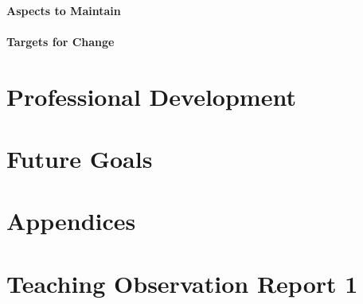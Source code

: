 \documentclass{article}
\begin{document}
\paragraph{Aspects to Maintain}

\paragraph{Targets for Change}

\section{Professional Development}
\section{Future Goals}

\appendix
\section*{Appendices}
\section{Teaching Observation Report 1}\label{sec:observation-report-1}
\end{document}
